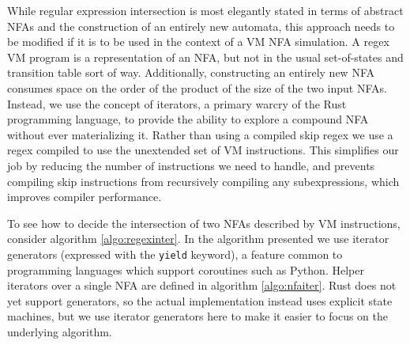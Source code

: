 While regular expression intersection is most elegantly stated
in terms of abstract NFAs and the construction of an entirely
new automata, this approach needs to be modified if it is
to be used in the context of a VM NFA simulation. A regex
VM program is a representation of an NFA, but not in the usual
set-of-states and transition
table sort of way. Additionally, constructing an entirely
new NFA consumes space on the order of the product of the
size of the two input NFAs. Instead, we use the concept of
iterators, a primary warcry of the Rust programming language,
to provide the ability to explore a compound NFA without
ever materializing it. Rather than using a compiled
skip regex we use a regex compiled to use the unextended
set of VM instructions. This simplifies our job by reducing
the number of instructions we need to handle, and prevents
compiling skip instructions from recursively compiling any
subexpressions, which improves compiler performance.

To see how to decide the intersection of two NFAs described
by VM instructions, consider algorithm \ref{algo:regexinter}.
In the algorithm presented we use iterator generators
(expressed with the \verb'yield' keyword),
a feature common to programming languages which support coroutines
such as Python. Helper iterators over a single NFA are defined
in algorithm \ref{algo:nfaiter}. Rust does not yet support generators, so the
actual implementation instead uses explicit state machines, but
we use iterator generators here to make it easier to focus on the underlying
algorithm.

